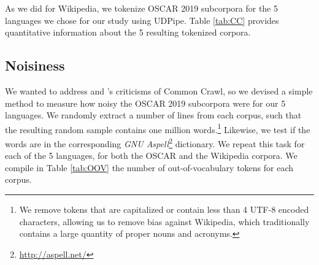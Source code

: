 As we did for Wikipedia, we tokenize OSCAR 2019 subcorpora for the 5 languages we chose for our study using UDPipe. Table \ref{tab:CC} provides quantitative information about the 5 resulting tokenized corpora.

\begin{table}[t]
    \centering\small
    \caption{Size of OSCAR 2019 subcorpora, measured in bytes, thousands of tokens, words and sentences.}
    \label{tab:CC}
\end{table}

\subsection{Noisiness}

We wanted to address \citep{trinh-le-2018-a} and \citep{radford-etal-2019-language}'s criticisms of Common Crawl, so we devised a simple method to measure how noisy the OSCAR 2019 subcorpora were for our 5 languages. We randomly extract a number of lines from each corpus, such that the resulting random sample contains one million words.\footnote{We remove tokens that are capitalized or contain less than 4 UTF-8 encoded characters, allowing us to remove bias against Wikipedia, which traditionally contains a large quantity of proper nouns and acronyms.} Likewise, we test if the words are in the corresponding \emph{GNU Aspell}\footnote{\url{http://aspell.net/}} dictionary. We repeat this task for each of the 5 languages, for both the OSCAR and the Wikipedia corpora. We compile in Table \ref{tab:OOV} the number of out-of-vocabulary tokens for each corpus.

